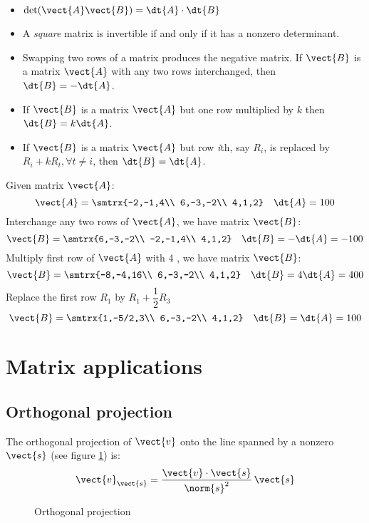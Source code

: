 \begin{itemize}
\item $\det (\vect{A}\vect{B})=\dt{A} \cdot \dt{B}$
\item A \emph{square} matrix is invertible if and only if it has a nonzero determinant.
\item Swapping two rows of a matrix produces the negative matrix. If $\vect{B}$ is a matrix $\vect{A}$ with any two rows interchanged, then $\dt{B}=-\dt{A}$.
\item If $\vect{B}$ is a matrix $\vect{A}$ but one row multiplied by $k$ then $\dt{B}=k\dt{A}$.
\item If $\vect{B}$ is a matrix $\vect{A}$ but row \emph{i}th, say $R_i$, is replaced by $R_i + kR_t, \forall t \neq i$, then $\dt{B}=\dt{A}$.
\end{itemize}
\begin{example}
Given matrix $\vect{A}$:
\[ \vect{A}=\smtrx{-2,-1,4\\ 6,-3,-2\\ 4,1,2} \quad \dt{A}=100 \]
Interchange any two rows of $\vect{A}$, we have matrix $\vect{B}$:
\[ \vect{B}=\smtrx{6,-3,-2\\ -2,-1,4\\ 4,1,2} \quad \dt{B}=-\dt{A}=-100 \]
Multiply first row of $\vect{A}$ with 4 , we have matrix $\vect{B}$:
\[ \vect{B}=\smtrx{-8,-4,16\\ 6,-3,-2\\ 4,1,2} \quad \dt{B}=4\dt{A}=400 \]
Replace the first row $R_1$ by $R_1+\dfrac{1}{2}R_3$
\[ \vect{B}=\smtrx{1,-5/2,3\\ 6,-3,-2\\ 4,1,2} \quad \dt{B}=\dt{A}=100 \]
\end{example}
\section{Matrix applications}
\subsection{Orthogonal projection}
The orthogonal projection of $\vect{v}$ onto the line spanned by a nonzero $\vect{s}$ (see figure \ref{Linalg_projection}) is: 
\[ \vect{v}_{\vect{s}}=\frac{\vect{v}\cdot\vect{s}}{\norm{s}^2} \, \vect{s} \]

\begin{figure}[hbtp]
\caption{Orthogonal projection}
\label{Linalg_projection}
\centering
\end{figure}

